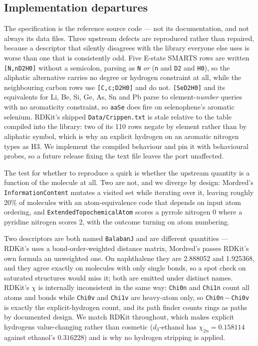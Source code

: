 \subsection{Implementation departures}

The specification is the reference source code --- not its documentation, and not always its
data files. Three upstream defects are reproduced rather than repaired, because a descriptor
that silently disagrees with the library everyone else uses is worse than one that is
consistently odd. Five E-state SMARTS rows are written \texttt{[N,nD2H0]} without a semicolon,
parsing as \texttt{N} \emph{or} (\texttt{n} and \texttt{D2} and \texttt{H0}), so the aliphatic
alternative carries no degree or hydrogen constraint at all, while the neighbouring carbon rows
use \texttt{[C,c;D2H0]} and do not. \texttt{[SeD2H0]} and its equivalents for Li, Be, Si, Ge,
As, Sn and Pb parse to element-\emph{number} queries with no aromaticity constraint, so
\texttt{aaSe} does fire on selenophene's aromatic selenium. RDKit's shipped
\texttt{Data/Crippen.txt} is stale relative to the table compiled into the library: two of its
110 rows negate by element rather than by aliphatic symbol, which is why an explicit hydrogen on
an aromatic nitrogen types as H3. We implement the compiled behaviour and pin it with
behavioural probes, so a future release fixing the text file leaves the port unaffected.

The test for whether to reproduce a quirk is whether the upstream quantity is a function of the
molecule at all. Two are not, and we diverge by design: Mordred's \texttt{InformationContent}
mutates a visited set while iterating over it, leaving roughly 20\% of molecules with an
atom-equivalence code that depends on input atom ordering, and
\texttt{ExtendedTopochemicalAtom} scores a pyrrole nitrogen 0 where a pyridine nitrogen scores
2, with the outcome turning on atom numbering.

Two descriptors are both named \texttt{BalabanJ} and are different quantities --- RDKit's uses a
bond-order-weighted distance matrix, Mordred's passes RDKit's own formula an unweighted one. On
naphthalene they are 2.888052 and 1.925368, and they agree exactly on molecules with only single
bonds, so a spot check on saturated structures would miss it; both are emitted under distinct
names. RDKit's $\chi$ is internally inconsistent in the same way: \texttt{Chi0n} and
\texttt{Chi1n} count all atoms and bonds while \texttt{Chi0v} and \texttt{Chi1v} are heavy-atom
only, so \texttt{Chi0n}\,$-$\,\texttt{Chi0v} is exactly the explicit-hydrogen count, and its
path finder counts rings as paths by documented design. We match RDKit throughout, which makes
explicit hydrogens value-changing rather than cosmetic ($d_3$-ethanol has
$\chi_{2n} = 0.158114$ against ethanol's $0.316228$) and is why no hydrogen stripping is applied.

